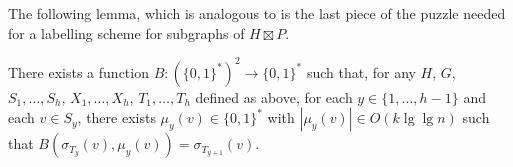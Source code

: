 \documentclass[kpfonts]{patmorin}
\let\le\leqslant
\begin{document}
% 
% 
% 
% 

The following lemma, which is analogous to  is the last piece of the puzzle needed for a labelling scheme for subgraphs of $H\boxtimes P$.

\begin{lem}
  There exists a function $B:(\{0,1\}^*)^2\to \{0,1\}^*$ such that, for any 
  $H$, $G$, $S_1,\ldots,S_h$, $X_1,\ldots,X_h$, $T_1,\ldots,T_h$ defined as above, for each $y\in\{1,\ldots,h-1\}$ and each $v\in S_y$, there exists $\mu_y(v)\in\{0,1\}^*$ with $|\mu_y(v)|\in O(k\lg\lg n)$ such that $B(\sigma_{T_y}(v), \mu_y(v))=\sigma_{T_{y+1}}(v)$.
\end{lem}
\end{document}
